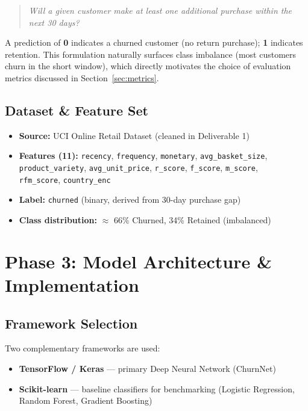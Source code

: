\documentclass[12pt, a4paper]{article}
\begin{document}
\begin{quote}
  \textit{Will a given customer make at least one additional purchase within the next 30 days?}
\end{quote}

A prediction of \textbf{0} indicates a churned customer (no return purchase); \textbf{1} indicates retention.
This formulation naturally surfaces class imbalance (most customers churn in the short window), which directly motivates the choice of evaluation metrics discussed in Section~\ref{sec:metrics}.

\subsection{Dataset \& Feature Set}
\begin{itemize}[noitemsep]
  \item \textbf{Source:} UCI Online Retail Dataset (cleaned in Deliverable 1)
  \item \textbf{Features (11):} \texttt{recency}, \texttt{frequency}, \texttt{monetary}, \texttt{avg\_basket\_size},\\
        \texttt{product\_variety}, \texttt{avg\_unit\_price}, \texttt{r\_score}, \texttt{f\_score}, \texttt{m\_score},\\
        \texttt{rfm\_score}, \texttt{country\_enc}
  \item \textbf{Label:} \texttt{churned} (binary, derived from 30-day purchase gap)
  \item \textbf{Class distribution:} $\approx$ 66\% Churned, 34\% Retained (imbalanced)
\end{itemize}

\section{Phase 3: Model Architecture \& Implementation}
\label{sec:phase3}

\subsection{Framework Selection}
Two complementary frameworks are used:
\begin{itemize}[noitemsep]
  \item \textbf{TensorFlow / Keras} — primary Deep Neural Network (ChurnNet)
  \item \textbf{Scikit-learn} — baseline classifiers for benchmarking (Logistic Regression, Random Forest, Gradient Boosting)
\end{itemize}
\end{document}
